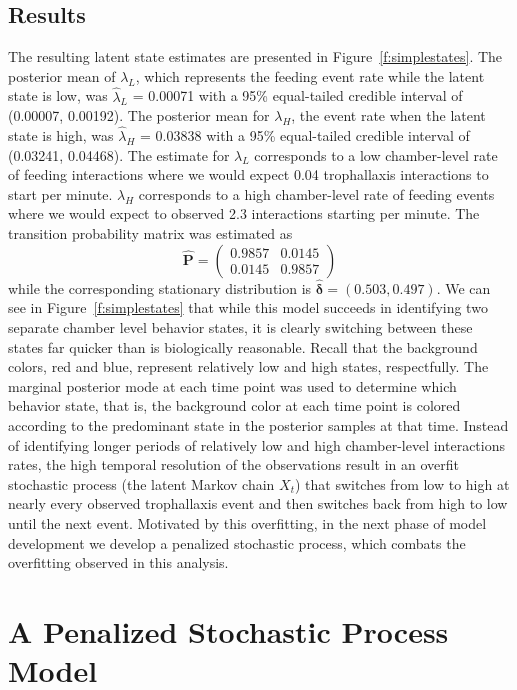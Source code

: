 \documentclass[smallextended]{svjour3}       %
\begin{document}
\subsection{Results}
The resulting latent state estimates are presented in Figure~\ref{f:simplestates}. The posterior mean of $\lambda_L$, which represents the feeding event rate while the latent state is low, was $\hat{\lambda}_L$ = 0.00071 with a 95\% equal-tailed credible interval of (0.00007, 0.00192). The posterior mean for $\lambda_H$, the event rate when the latent state is high, was $\hat{\lambda}_H$ = 0.03838 with a 95\% equal-tailed credible interval of (0.03241, 0.04468). The estimate for $\lambda_L$ corresponds to a low chamber-level rate of feeding interactions where we would expect 0.04 trophallaxis interactions to start per minute. $\lambda_H$ corresponds to a high chamber-level rate of feeding events where we would expect to observed 2.3 interactions starting per minute. The transition probability matrix was estimated as 
\begin{equation}
\hat{\mathbf{P}} = \begin{pmatrix}
0.9857 & 0.0145\\
0.0145 & 0.9857 
\end{pmatrix}
\end{equation}
while the corresponding stationary distribution is $\hat{\bm{\delta}} = (0.503, 0.497)$. 
We can see in Figure~\ref{f:simplestates} that while this model succeeds in identifying two separate chamber level behavior states, it is clearly switching between these states far quicker than is biologically reasonable. Recall that the background colors, red and blue, represent relatively low and high states, respectfully. The marginal posterior mode at each time point was used to determine which behavior state, that is, the background color at each time point is colored according to the predominant state in the posterior samples at that time.  
Instead of identifying longer periods of relatively low and high chamber-level interactions rates, the high temporal resolution of the observations result in an overfit stochastic process (the latent Markov chain $X_t$) that switches from low to high at nearly every observed trophallaxis event and then switches back from high to low until the next event. Motivated by this overfitting, in the next phase of model development we develop a  penalized stochastic process, which combats the overfitting observed in this analysis. 
\section{A Penalized Stochastic Process Model}
\label{s:penalized}
\end{document}
